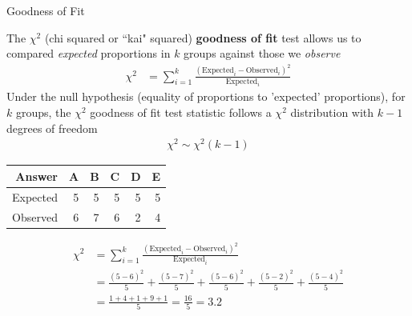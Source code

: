 \documentclass{beamer}
\begin{document}
\begin{frame}{Goodness of Fit}

The $\chi^2$ (chi squared or ``kai" squared) \textbf{goodness of fit} test allows us to compared \textit{expected} proportions in $k$ groups against those we \textit{observe}
\begin{align*}
\chi^2 &= \sum_{i=1}^k \frac{(\text{Expected}_i - \text{Observed}_i)^2}{\text{Expected}_i} 
\end{align*}
Under the null hypothesis (equality of proportions to 'expected' proportions), for $k$ groups, the $\chi^2$ goodness of fit test statistic follows a $\chi^2$ distribution with $k-1$ degrees of freedom
\begin{align*}
\chi^2 \sim \chi^2(k-1)
\end{align*}

\end{frame}

\begin{frame}
\begin{table}[ht]
\centering
\begin{tabular}{rrrrrr}
  \hline
Answer & A & B & C & D & E \\ 
  \hline
Expected & 5 & 5 & 5 & 5 & 5 \\ 
  Observed & 6 & 7 & 6 & 2 & 4 \\ 
   \hline
\end{tabular}
\end{table}

\begin{align*}
\chi^2 &= \sum_{i=1}^k \frac{(\text{Expected}_i - \text{Observed}_i)^2}{\text{Expected}_i} \\[1em]
&= \frac{(5-6)^2}{5} + \frac{(5-7)^2}{5} + \frac{(5-6)^2}{5} + \frac{(5-2)^2}{5}+\frac{(5-4)^2}{5} \\[1em]
&= \frac{1 + 4 + 1 + 9 + 1}{5} = \frac{16}{5} = 3.2
\end{align*}

\end{frame}
\end{document}
